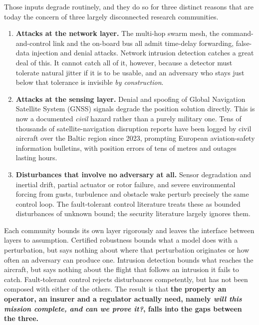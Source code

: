 \documentclass[11pt,a4paper]{article}
\begin{document}
Those inputs degrade routinely, and they do so for three distinct reasons that are today the concern of three largely disconnected research communities.

\begin{enumerate}
\item \textbf{Attacks at the network layer.} The multi-hop swarm mesh, the command-and-control link and the on-board bus all admit time-delay forwarding, false-data injection and denial attacks. Network intrusion detection catches a great deal of this. It cannot catch all of it, however, because a detector must tolerate natural jitter if it is to be usable, and an adversary who stays just below that tolerance is invisible \emph{by construction}.
\item \textbf{Attacks at the sensing layer.} Denial and spoofing of Global Navigation Satellite System (GNSS) signals degrade the position solution directly. This is now a documented \emph{civil} hazard rather than a purely military one. Tens of thousands of satellite-navigation disruption reports have been logged by civil aircraft over the Baltic region since 2023, prompting European aviation-safety information bulletins, with position errors of tens of metres and outages lasting hours.
\item \textbf{Disturbances that involve no adversary at all.} Sensor degradation and inertial drift, partial actuator or rotor failure, and severe environmental forcing from gusts, turbulence and obstacle wake perturb precisely the same control loop. The fault-tolerant control literature treats these as bounded disturbances of unknown bound; the security literature largely ignores them.
\end{enumerate}

Each community bounds its own layer rigorously and leaves the interface between layers to assumption. Certified robustness bounds what a model does with a perturbation, but says nothing about where that perturbation originates or how often an adversary can produce one. Intrusion detection bounds what reaches the aircraft, but says nothing about the flight that follows an intrusion it fails to catch. Fault-tolerant control rejects disturbances competently, but has not been composed with either of the others. The result is that \textbf{the property an operator, an insurer and a regulator actually need, namely \emph{will this mission complete, and can we prove it?}, falls into the gaps between the three.}
\end{document}
